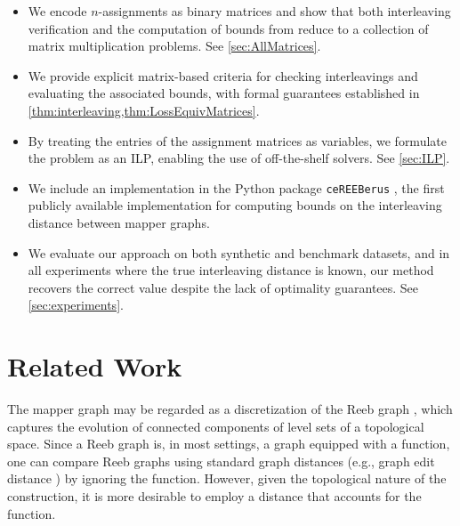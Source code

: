 \begin{itemize}
\item {} We encode $n$-assignments as binary matrices and show that both interleaving verification and the computation of bounds from \cite{chambers2023bounding} reduce to a collection of matrix multiplication problems. See \cref{sec:AllMatrices}.

\item {} We provide explicit matrix-based criteria for checking interleavings and evaluating the associated bounds, with formal guarantees established in \cref{thm:interleaving,thm:LossEquivMatrices}.

\item {} By treating the entries of the assignment matrices as variables, we formulate the problem as an ILP, enabling the use of off-the-shelf solvers. See \cref{sec:ILP}.

\item {} We include an implementation in the Python package \texttt{ceREEBerus} \cite{cereeberus}, the first publicly available implementation for computing bounds on the interleaving distance between mapper graphs. 

\item {} We evaluate our approach on both synthetic and benchmark datasets, and in all experiments where the true interleaving distance is known, our method recovers the correct value despite the lack of optimality guarantees.
See \cref{sec:experiments}.
\end{itemize}

\section{Related Work}
\label{sec:RelatedWork} 

The mapper graph may be regarded as a discretization of the Reeb graph \cite{Reeb}, which captures the evolution of connected components of level sets of a topological space. Since a Reeb graph is, in most settings, a graph equipped with a function, one can compare Reeb graphs using standard graph distances (e.g., graph edit distance \cite{Gao2010}) by ignoring the function. However, given the topological nature of the construction, it is more desirable to employ a distance that accounts for the function.

